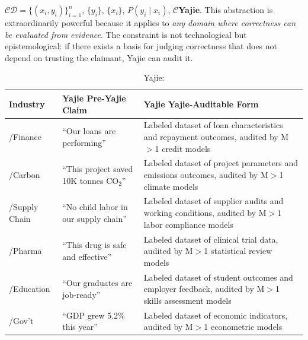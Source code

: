 \documentclass[12pt,a4paper]{article}
\theoremstyle{remark}
\begin{document}
$\mathcal{C}$$\mathcal{D} = \{(x_i, y_i)\}_{i=1}^n$, 
$\{y_i\}$, $\{x_i\}$, 
$P(y_i \mid x_i)$, $\mathcal{C}$\textbf{Yajie}.
This abstraction is extraordinarily powerful because it applies to \textit{any domain 
where correctness can be evaluated from evidence}. The constraint is not technological 
but epistemological: if there exists a basis for judging correctness that does not depend 
on trusting the claimant, Yajie can audit it.
\begin{table}[H]
\centering
\caption{Yajie:}
\label{tab:conversion}
\small
\begin{tabular}{@{}p{2.5cm} p{5cm} p{5cm}@{}}
\toprule
\textbf{ Industry} & \textbf{Yajie Pre-Yajie Claim} & \textbf{Yajie Yajie-Auditable Form} \\
\midrule
/Finance & ``Our loans are performing'' & Labeled dataset of loan characteristics and repayment outcomes, audited by M$>$1 credit models \\
\addlinespace
/Carbon & ``This project saved 10K tonnes CO$_2$'' & Labeled dataset of project parameters and emissions outcomes, audited by M$>$1 climate models \\
\addlinespace
/Supply Chain & ``No child labor in our supply chain'' & Labeled dataset of supplier audits and working conditions, audited by M$>$1 labor compliance models \\
\addlinespace
/Pharma & ``This drug is safe and effective'' & Labeled dataset of clinical trial data, audited by M$>$1 statistical review models \\
\addlinespace
/Education & ``Our graduates are job-ready'' & Labeled dataset of student outcomes and employer feedback, audited by M$>$1 skills assessment models \\
\addlinespace
/Gov't & ``GDP grew 5.2\% this year'' & Labeled dataset of economic indicators, audited by M$>$1 econometric models \\
\bottomrule
\end{tabular}
\end{table}
\end{document}
